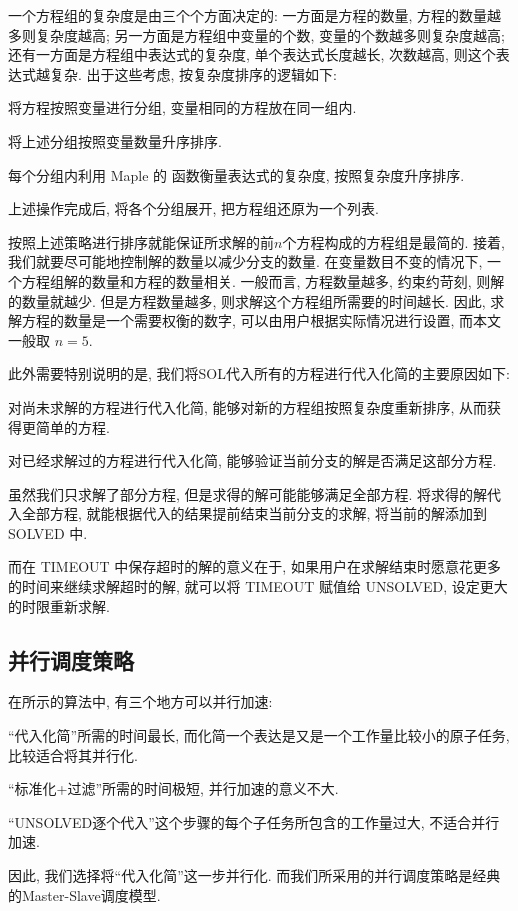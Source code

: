一个方程组的复杂度是由三个个方面决定的: 一方面是方程的数量, 方程的数量越多则复杂度越高; 另一方面是方程组中变量的个数, 变量的个数越多则复杂度越高; 还有一方面是方程组中表达式的复杂度, 单个表达式长度越长, 次数越高, 则这个表达式越复杂. 出于这些考虑, 按复杂度排序的逻辑如下:
\begin{compactenum}[(1)]
\item 将方程按照变量进行分组, 变量相同的方程放在同一组内.
\item 将上述分组按照变量数量升序排序.
\item 每个分组内利用 Maple 的  函数衡量表达式的复杂度, 按照复杂度升序排序.  
\item 上述操作完成后, 将各个分组展开, 把方程组还原为一个列表. 
\end{compactenum}

按照上述策略进行排序就能保证所求解的前$n$个方程构成的方程组是最简的. 接着, 我们就要尽可能地控制解的数量以减少分支的数量. 在变量数目不变的情况下, 一个方程组解的数量和方程的数量相关. 一般而言, 方程数量越多, 约束约苛刻, 则解的数量就越少. 但是方程数量越多, 则求解这个方程组所需要的时间越长. 因此, 求解方程的数量是一个需要权衡的数字, 可以由用户根据实际情况进行设置, 而本文一般取 $n=5$.

此外需要特别说明的是, 我们将SOL代入所有的方程进行代入化简的主要原因如下: 
\begin{compactenum}[(1)]
\item 对尚未求解的方程进行代入化简, 能够对新的方程组按照复杂度重新排序, 从而获得更简单的方程.
\item 对已经求解过的方程进行代入化简, 能够验证当前分支的解是否满足这部分方程. 
\item 虽然我们只求解了部分方程, 但是求得的解可能能够满足全部方程. 将求得的解代入全部方程, 就能根据代入的结果提前结束当前分支的求解, 将当前的解添加到 SOLVED 中. 
\end{compactenum} 

而在 TIMEOUT 中保存超时的解的意义在于, 如果用户在求解结束时愿意花更多的时间来继续求解超时的解, 就可以将 TIMEOUT 赋值给 UNSOLVED, 设定更大的时限重新求解. 

\subsection{并行调度策略} 
在所示的算法中, 有三个地方可以并行加速:  
\begin{compactitem}[\textbullet]
\item ``代入化简''所需的时间最长, 而化简一个表达是又是一个工作量比较小的原子任务, 比较适合将其并行化.
\item ``标准化+过滤''所需的时间极短, 并行加速的意义不大.
\item ``UNSOLVED逐个代入''这个步骤的每个子任务所包含的工作量过大, 不适合并行加速.
\end{compactitem}
因此, 我们选择将``代入化简''这一步并行化. 而我们所采用的并行调度策略是经典的Master-Slave调度模型\cite{sahni1996master}. 

